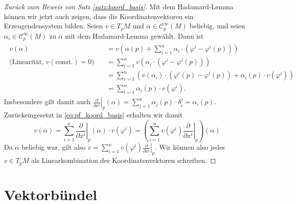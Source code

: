 \documentclass[a4paper]{scrreprt}
\numberwithin{equation}{chapter}
\newcommand{\sC}{\mathcal{C}^{\infty}}
\theoremstyle{definition}
\begin{document}
\begin{proof}[Zurück zum Beweis von Satz \ref{satz:koord_basis}]
	Mit dem Hadamard-Lemma können wir jetzt auch zeigen, dass die Koordinatenvektoren ein Erzeugendensystem bilden. Seien $v \in T_pM$ und $\alpha \in \sC_p(M)$ beliebig, und seien $\alpha_i \in \sC_p(M)$ zu $\alpha$ mit dem Hadamard-Lemma gewählt. Dann ist
	\begin{align}\begin{split} \label{eq:pf_koord_basis}
		v(\alpha) &= v\left(\alpha(p) + \sum_{i=1}^n \alpha_i \cdot (\varphi^i - \varphi^i(p))\right)\\
		\text{(Linearität, $v(\text{const.}) = 0$)} \quad &= \sum_{i=1}^n v(\alpha_i \cdot (\varphi^i - \varphi^i(p)))\\
		&= \sum_{i=1}^n \left( v(\alpha_i) \cdot (\varphi^i(p) - \varphi^i(p)) + \alpha_i(p) \cdot v(\varphi^i) \right)\\
		&= \sum_{i=1}^n \alpha_i(p) \cdot v(\varphi^i).
	\end{split}\end{align}
	Insbesondere gilt damit auch $\left.\frac{\partial}{\partial x^i}\right|_p (\alpha) = \sum_{j=1}^n \alpha_j(p) \cdot \delta^j_i = \alpha_i(p)$. Zurückeingesetzt in \eqref{eq:pf_koord_basis} erhalten wir damit
	\begin{equation*}
		v(\alpha) = \sum_{i=1}^n \left.\frac{\partial}{\partial x^i}\right|_p (\alpha) \cdot v(\varphi^i)
		= \left(\sum_{i=1}^n v(\varphi^i) \left.\frac{\partial}{\partial x^i}\right|_p \right)(\alpha)
	\end{equation*}
	Da $\alpha$ beliebig war, gilt also $v = \sum_{i=1}^n v(\varphi^i) \left.\frac{\partial}{\partial x^i}\right|_p$. Wir können also jedes $v \in T_pM$ als Linearkombination der Koordinatenvektoren schreiben.
\end{proof}


\chapter{Vektorbündel}
\end{document}
